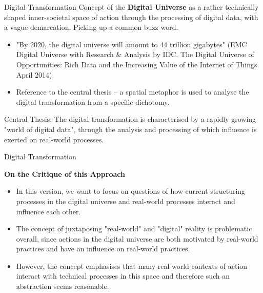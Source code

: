 \documentclass{beamer}
\title{Modelling Sustainable Systems\\ and Semantic Web\\[6pt]
  Digital Action Space
  \vskip1em}
\subtitle{Lecture in the Module 10-202-2309\\ for Master Computer Science}
\author{Prof. Dr. Hans-Gert Gräbe\\
\url{http://www.informatik.uni-leipzig.de/~graebe}}
\date{November 2021}
\newcommand{\ueberschrift}[1]{\begin{center}\bf #1\end{center}}
\begin{document}
{
\begin{frame}
  \titlepage
\end{frame}}

\begin{frame}{Digital Transformation}
  Concept of the \textbf{Digital Universe} as a rather technically shaped
  inner-societal space of action through the processing of digital data, with
  a vague demarcation.  Picking up a common buzz word.
\begin{itemize}
\item "By 2020, the digital universe will amount to 44 trillion gigabytes"
  (EMC Digital Universe with Research \& Analysis by IDC. The Digital Universe
  of Opportunities: Rich Data and the Increasing Value of the Internet of
  Things. April 2014).
\item Reference to the central thesis -- a spatial metaphor is used to analyse
  the digital transformation from a specific dichotomy.
\end{itemize}
\begin{block}{Central Thesis:}
  The digital transformation is characterised by a rapidly growing "world of
  digital data", through the analysis and processing of which influence is
  exerted on real-world processes.
\end{block}
\end{frame}
\begin{frame}{Digital Transformation}
  \ueberschrift{On the Critique of this Approach}
  \begin{itemize}
  \item In this version, we want to focus on questions of how current
    structuring processes in the digital universe and real-world processes
    interact and influence each other.
  \item The concept of juxtaposing "real-world" and "digital" reality is
    problematic overall, since actions in the digital universe are both
    motivated by real-world practices and have an influence on real-world
    practices.
 \item However, the concept emphasises that many real-world contexts of action
   interact with technical processes in this space and therefore such an
   abstraction seems reasonable.
  \end{itemize}
\end{frame}
\end{document}
